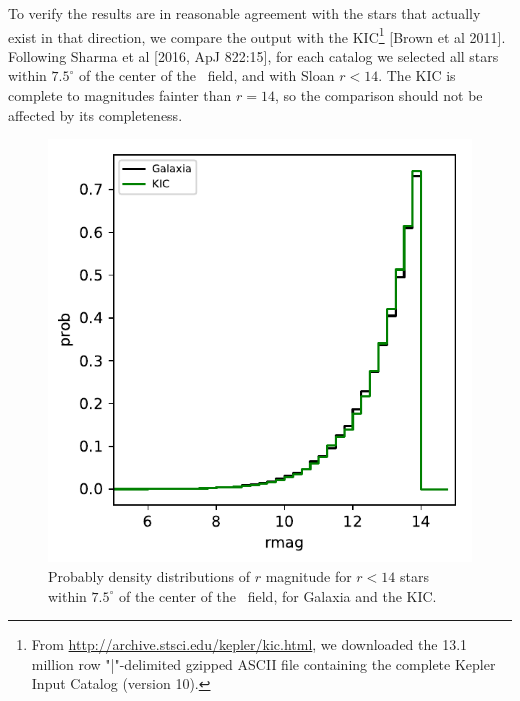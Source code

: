 \documentclass{emulateapj}
\begin{document}
To verify the results are in reasonable agreement with the stars that actually 
exist in that direction, we compare the output with the KIC\footnote{From 
\url{http://archive.stsci.edu/kepler/kic.html}, we 
downloaded the 13.1 million row "|"-delimited gzipped ASCII file containing the 
complete Kepler Input Catalog (version 10).} [Brown et al 2011].
Following Sharma et al [2016, ApJ 822:15], for each catalog we selected all 
stars within $7.5^\circ$ of the center of the \kepler\ field, and with Sloan $r 
< 14$.
The KIC is complete to magnitudes fainter than $r=14$, so the comparison should 
not be affected by its completeness.

\begin{figure}[!t]
	\begin{center}
		\includegraphics[scale=.8]{figures/rmag_distribn.pdf}
	\end{center}
	\caption{Probably density distributions of $r$ magnitude for $r<14$ stars 
	within $7.5^\circ$ of the center of the \kepler\ field, for Galaxia and the 
	KIC.	}
	\label{fig:rmag_distribn}
\end{figure}
\end{document}
